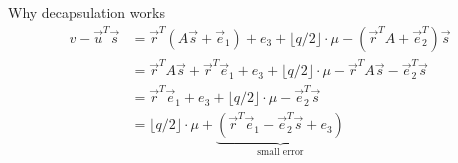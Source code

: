 \documentclass[aspectratio=169, lualatex, handout]{beamer}
\begin{document}
\begin{frame}{Why decapsulation works}
	\begin{align*}
		v - \vec{u}^T\vec{s} & = \vec{r}^{T}(A\vec{s} + \vec{e}_1) + e_3 + \lfloor q/2 \rfloor \cdot \mu - (\vec{r}^{T}A + \vec{e}_{2}^{T})\vec{s}               \\
		                     & = \vec{r}^{T}A\vec{s} + \vec{r}^{T}\vec{e}_1 + e_3 + \lfloor q/2 \rfloor \cdot \mu - \vec{r}^{T}A\vec{s} - \vec{e}_{2}^{T}\vec{s} \\
		                     & = \vec{r}^{T}\vec{e}_{1} + e_3 + \lfloor q/2 \rfloor \cdot \mu - \vec{e}_{2}^{T}\vec{s}                                           \\
		                     & = \lfloor q/2 \rfloor \cdot \mu + \underbrace{(\vec{r}^{T}\vec{e}_{1} - \vec{e}_{2}^{T}\vec{s} + e_3)}_{\text{small error}}
	\end{align*}
\end{frame}
\end{document}
